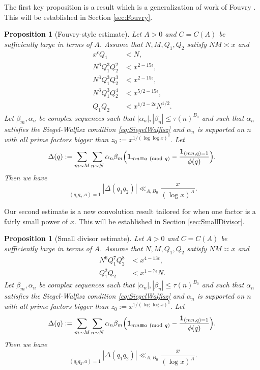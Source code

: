 \documentclass[10pt]{amsart}
\theoremstyle{plain}
\newtheorem{prpstn}[thrm]{Proposition}
\numberwithin{equation}{section}
\newcommand{\Mod}[1]{\ (\mathrm{mod}\ #1)}
\begin{document}
The first key proposition is a result which is a generalization of work of Fouvry \cite{Fouvry}. This will be established in Section \ref{sec:Fouvry}.
%
%
%
%
%
%
%
%
\begin{prpstn}[Fouvry-style estimate]\label{prpstn:Fouvry}
Let $A>0$ and $C=C(A)$ be sufficiently large in terms of $A$. Assume that $N,M,Q_1,Q_2$ satisfy $NM\asymp x$ and
\begin{align*}
x^\epsilon Q_1&<N,\\
N^6 Q_1^{3}Q_2^2 &<x^{2-15\epsilon},\\
N^{3}Q_1^{3}Q_2^{3}&<x^{2-15\epsilon},\\
N^{3}Q_1^{3}Q_2^{4}&<x^{5/2-15\epsilon},\\
Q_1Q_2&<x^{1/2-2\epsilon}N^{1/2}.
\end{align*}
Let $\beta_m,\alpha_n$ be complex sequences such that $|\alpha_n|,|\beta_n|\le \tau(n)^{B_0}$ and such that $\alpha_{n}$ satisfies the Siegel-Walfisz condition \eqref{eq:SiegelWalfisz} and $\alpha_n$ is supported on $n$ with all prime factors bigger than $z_0:=x^{1/(\log\log{x})^3}$. Let
\[
\Delta(q):=\sum_{m\sim M}\sum_{\substack{n\sim N}}\alpha_n\beta_m\Bigl(\mathbf{1}_{m n\equiv a \Mod{q}}-\frac{\mathbf{1}_{(m n,q)=1}}{\phi(q)}\Bigr).
\]
Then we have
\[
\mathop{\sum_{q_1\sim Q_1}\sum_{q_2\sim Q_2}}\limits_{(q_1q_2,a)=1}|\Delta(q_1q_2)|\ll_{A,B_0} \frac{x}{(\log{x})^A}.
\]
\end{prpstn}
%
%
%
%
%
%
%
%
Our second estimate is a new convolution result tailored for when one factor is a fairly small power of $x$. This will be established in Section \ref{sec:SmallDivisor}.
%
%
%
%
%
%
%
%
\begin{prpstn}[Small divisor estimate]\label{prpstn:SmallDivisor}
Let $A>0$ and $C=C(A)$ be sufficiently large in terms of $A$. Assume that $N,M,Q_1,Q_2$ satisfy $NM\asymp x$ and
\begin{align*}
N^6 Q_1^{7} Q_2^8&<x^{4-13\epsilon},\\
Q_1^2 Q_2&<x^{1-7\epsilon} N.
\end{align*}
Let $\beta_m,\alpha_n$ be complex sequences such that $|\alpha_n|,|\beta_n|\le \tau(n)^{B_0}$ and such that $\alpha_{n}$ satisfies the Siegel-Walfisz condition \eqref{eq:SiegelWalfisz} and $\alpha_n$ is supported on $n$ with all prime factors bigger than $z_0:=x^{1/(\log\log{x})^3}$. Let
\[
\Delta(q):=\sum_{m\sim M}\sum_{\substack{n\sim N}}\alpha_n\beta_m\Bigl(\mathbf{1}_{mn\equiv a \Mod{q}}-\frac{\mathbf{1}_{(mn,q)=1}}{\phi(q)}\Bigr).
\]
Then we have
\[
\mathop{\sum_{q_1\sim Q_1}\sum_{q_2\sim Q_2}}\limits_{(q_1q_2,a)=1}|\Delta(q_1q_2)|\ll_{A,B_0} \frac{x}{(\log{x})^A}.
\]
\end{prpstn}
\end{document}
